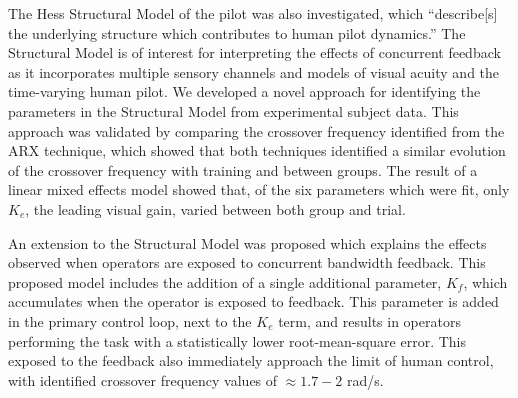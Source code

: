 The Hess Structural Model of the pilot was also investigated, which ``describe[s] the underlying structure which contributes to human pilot dynamics.''
The Structural Model is of interest for interpreting the effects of concurrent feedback as it incorporates multiple sensory channels and models of visual acuity and the time-varying human pilot.
We developed a novel approach for identifying the parameters in the Structural Model from experimental subject data.
This approach was validated by comparing the crossover frequency identified from the ARX technique, which showed that both techniques identified a similar evolution of the crossover frequency with training and between groups.
The result of a linear mixed effects model showed that, of the six parameters which were fit, only $K_e$, the leading visual gain, varied between both group and trial.

An extension to the Structural Model was proposed which explains the effects observed when operators are exposed to concurrent bandwidth feedback.
This proposed model includes the addition of a single additional parameter, $K_f$, which accumulates when the operator is exposed to feedback.
This parameter is added in the primary control loop, next to the $K_e$ term, and results in operators performing the task with a statistically lower root-mean-square error.
This exposed to the feedback also immediately approach the limit of human control, with identified crossover frequency values of $\approx 1.7-2$ rad/s.
